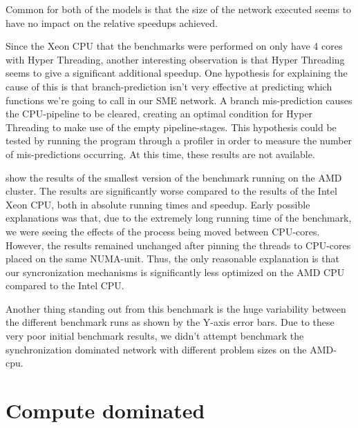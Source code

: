 
Common for both of the models is that the size of the network
executed seems to have no impact on the relative speedups achieved.

Since the Xeon CPU that the benchmarks were performed on only have 4
cores with Hyper Threading, another interesting observation is that
Hyper Threading seems to give a significant additional speedup. One
hypothesis for explaining the cause of this is that branch-prediction
isn't very effective at predicting which functions we're going to call
in our SME network. A branch mis-prediction causes the CPU-pipeline to
be cleared, creating an optimal condition for Hyper Threading to make
use of the empty pipeline-stages\cite{fog2014microarchitecture}. This
hypothesis could be tested by running the program through a profiler
in order to measure the number of mis-predictions occurring. At this
time, these results are not available.

 show the results of the smallest version of the
benchmark running on the AMD cluster. The results are significantly
worse compared to the results of the Intel Xeon CPU, both in absolute
running times and speedup. Early possible explanations was that, due
to the extremely long running time of the benchmark, we were seeing
the effects of the process being moved between CPU-cores. However, the
results remained unchanged after pinning the threads to CPU-cores
placed on the same NUMA-unit. Thus, the only reasonable explanation is
that our syncronization mechanisms is significantly less optimized on
the AMD CPU compared to the Intel CPU.

Another thing standing out from this benchmark is the huge variability
between the different benchmark runs as shown by the Y-axis error bars.
Due to these very poor initial benchmark results, we didn't attempt
benchmark the synchronization dominated network with different problem
sizes on the AMD-cpu.


\section{Compute dominated}

